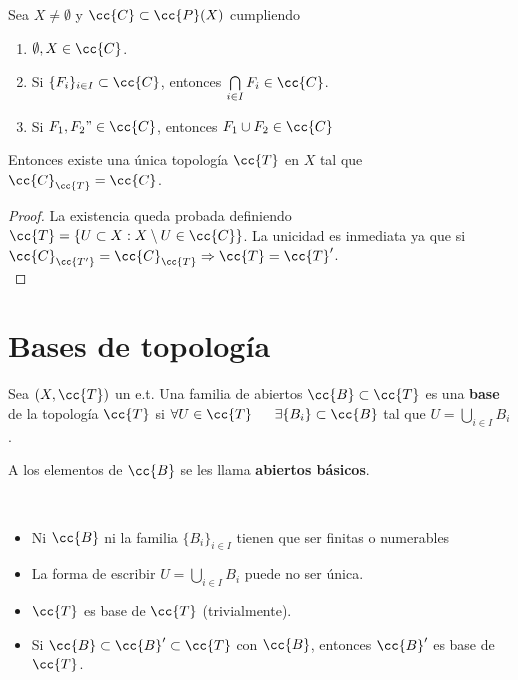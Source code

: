 \begin{teo}
    Sea $X\neq \emptyset$ y $\cc{C}\subset \cc{P}(X)$ cumpliendo
    \begin{enumerate}
        \item[\apuntar{C1}] $\emptyset, X \in \cc{C}$.
        \item[\apuntar{C2}] Si $\{F_i\}_{i\in I}\subset \cc{C}$, entonces $\bigcap\limits_{i\in I}F_i \in \cc{C}$.
        \item[\apuntar{C3}] Si $F_1, F_2" \in \cc{C}$, entonces $F_1 \cup F_2 \in \cc{C}$
    \end{enumerate}

    Entonces existe una única topología $\cc{T}$ en $X$ tal que $\cc{C}_{\cc{T}}=\cc{C}$.

    \begin{proof}
        La existencia queda probada definiendo $\cc{T}=\{U\subset X : X \setminus U \in \cc{C}\}$.
        La unicidad es inmediata ya que si $\cc{C}_{\cc{T'}}=\cc{C}_{\cc{T}}\Rightarrow \cc{T}=\cc{T}'$.\\
    \end{proof}
\end{teo}

\section{Bases de topología}

\begin{definicion}
    Sea $(X,\cc{T})$ un e.t. Una familia de abiertos $\cc{B}\subset \cc{T}$ es una \textbf{base} de la topología $\cc{T}$ si $\forall U \in \cc{T}$\ \ \ $\exists \{B_i\}\subset \cc{B}$ tal que $U=\bigcup\limits_{i\in I}B_i$.

    A los elementos de $\cc{B}$ se les llama \textbf{abiertos básicos}.
    \endsquare
\end{definicion}

\begin{observacion}\
    \begin{itemize}
        \item Ni $\cc{B}$ ni la familia $\{B_i\}_{i\in I}$ tienen que ser finitas o numerables
        \item La forma de escribir $U=\bigcup\limits_{i\in I} B_i$ puede no ser única.
        \item $\cc{T}$ es base de $\cc{T}$ (trivialmente).
        \item Si $\cc{B}\subset \cc{B}'\subset \cc{T}$ con $\cc{B}$, entonces $\cc{B}'$ es base de $\cc{T}$.
    \end{itemize}
    \endsquare
\end{observacion}

